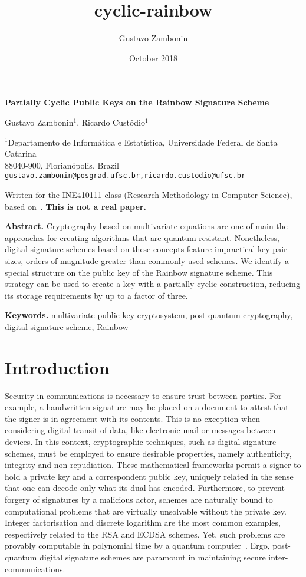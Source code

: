\documentclass[a4paper, 14pt]{extarticle}
\title{cyclic-rainbow}
\author{Gustavo Zambonin}
\date{October 2018}
\begin{document}
\begin{center}
    {\Large\bf Partially Cyclic Public Keys on the Rainbow Signature Scheme} \vspace{.75cm}
    
    Gustavo Zambonin$^{1}$, Ricardo Custódio$^{1}$
    
    $^{1}$Departamento de Informática e Estatística, Universidade Federal de Santa Catarina \\
    88040-900, Florianópolis, Brazil \\
    \texttt{gustavo.zambonin@posgrad.ufsc.br,ricardo.custodio@ufsc.br}
    
     Written for the INE410111 class (Research Methodology in Computer Science), based on~\cite{petzoldt2013selecting}. \textbf{This is not a real paper.} \vspace{.75cm}
\end{center}

\textbf{Abstract.} Cryptography based on multivariate equations are one of main the approaches for creating algorithms that are quantum-resistant. Nonetheless, digital signature schemes based on these concepts feature impractical key pair sizes, orders of magnitude greater than commonly-used schemes. We identify a special structure on the public key of the Rainbow signature scheme. This strategy can be used to create a key with a partially cyclic construction, reducing its storage requirements by up to a factor of three.

\textbf{Keywords.} multivariate public key cryptosystem, post-quantum cryptography, digital signature scheme, Rainbow

\section{Introduction}

Security in communications is necessary to ensure trust between parties. For example, a handwritten signature may be placed on a document to attest that the signer is in agreement with its contents. This is no exception when considering digital transit of data, like electronic mail or messages between devices. In this context, cryptographic techniques, such as digital signature schemes, must be employed to ensure desirable properties, namely authenticity, integrity and non-repudiation. These mathematical frameworks permit a signer to hold a private key and a correspondent public key, uniquely related in the sense that one can decode only what its dual has encoded. Furthermore, to prevent forgery of signatures by a malicious actor, schemes are naturally bound to computational problems that are virtually unsolvable without the private key. Integer factorisation and discrete logarithm are the most common examples, respectively related to the RSA and ECDSA schemes. Yet, such problems are provably computable in polynomial time by a quantum computer~\cite{Shor}. Ergo, post-quantum digital signature schemes are paramount in maintaining secure inter-communications.
\end{document}
